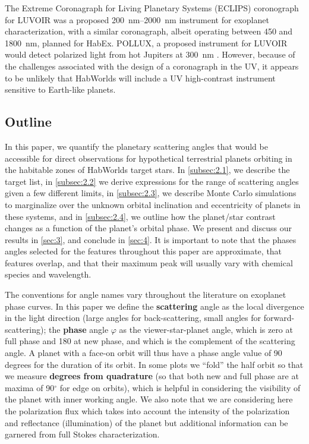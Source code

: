 \documentclass[
    usenatbib,
]{mnras}
\newcommand{\hwo}{HabWorlds}
\begin{document}
The Extreme Coronagraph for Living Planetary Systems (ECLIPS) coronograph for LUVOIR was a proposed \qtyrange{200}{2000}{\nano\meter} instrument for exoplanet characterization, with a similar coronagraph, albeit operating between \num{450} and \qty{1800}{\nano\meter}, planned for HabEx.
%
POLLUX, a proposed instrument for LUVOIR would detect polarized light from hot Jupiters at \qty{300}{\nano\meter} \citep{Bouret2018_pollux}.
%
However, because of the challenges associated with the design of a coronagraph in the UV, it appears to be unlikely that \hwo{} will include a UV high-contrast instrument sensitive to Earth-like planets.


\subsection{Outline}

In this paper, we quantify the planetary scattering angles that would be accessible for direct observations for hypothetical terrestrial planets orbiting in the habitable zones of \hwo{} target stars.
%
In \cref{subsec:2.1}, we describe the target list, in \cref{subsec:2.2} we derive expressions for the range of scattering angles given a few different limits, in \cref{subsec:2.3}, we describe Monte Carlo simulations to marginalize over the unknown orbital inclination and eccentricity of planets in these systems, and in \cref{subsec:2.4}, we outline how the planet/star contrast changes as a function of the planet's orbital phase.  
%
We present and discuss our results in \cref{sec:3}, and conclude in \cref{sec:4}. 
It is important to note that the phases angles selected for the features throughout this paper are approximate, that features overlap, and that their maximum peak will usually vary with chemical species and wavelength.

The conventions for angle names vary throughout the literature on exoplanet phase curves. In this paper we define the \textbf{scattering} angle as the local divergence in the light direction (large angles for back-scattering, small angles for forward-scattering); the \textbf{phase} angle $\varphi$ as the viewer-star-planet angle, which is zero at full phase and 180 at new phase, and which is the complement of the scattering angle. A planet with a face-on orbit will thus have a phase angle value of 90 degrees for the duration of its orbit.  In some plots we ``fold'' the half orbit so that we measure \textbf{degrees from quadrature} (so that both new and full phase are at maxima of 90$^\circ$ for edge on orbits), which is helpful in considering the visibility of the planet with inner working angle. We also note that we are considering here the polarization flux which takes into account the intensity of the polarization and reflectance (illumination) of the planet but additional information can be garnered from full Stokes characterization.
\end{document}

